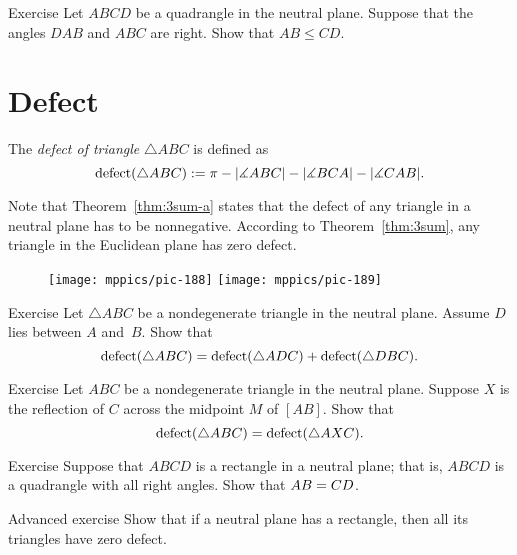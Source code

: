 \begin{thm}{Exercise}\label{ex:neutral-quadrangle}
Let $ABCD$ be a quadrangle in the neutral plane.
Suppose that the angles $DAB$ and $ABC$ are right.
Show that $AB\le CD$.
\end{thm}

\section*{Defect}

The \emph{defect of triangle} $\triangle ABC$ is defined as 
$$\mathop{\rm defect}\nolimits(\triangle ABC)
:= 
\pi-|\measuredangle ABC|-|\measuredangle BCA|-|\measuredangle CAB|.$$

Note that Theorem~\ref{thm:3sum-a} states that the defect of any triangle in a neutral plane has to be nonnegative.
According to Theorem~\ref{thm:3sum}, any triangle in
the Euclidean plane has zero defect.

{

\begin{wrapfigure}{o}{24mm}
\vskip-6mm
\centering
\texttt{[image: mppics/pic-188]}
\vskip4mm
\texttt{[image: mppics/pic-189]}
\end{wrapfigure}

\begin{thm}{Exercise}\label{ex:defect}
Let $\triangle ABC$ be a nondegenerate triangle in the neutral plane.
Assume $D$ lies between $A$ and~$B$.
Show that 
$$\mathop{\rm defect}\nolimits(\triangle ABC)=\mathop{\rm defect}\nolimits(\triangle ADC)+\mathop{\rm defect}\nolimits(\triangle DBC).$$

\end{thm}


\begin{thm}{Exercise}\label{ex:defect=} Let $ABC$ be a nondegenerate triangle in the neutral plane.
Suppose $X$ is the reflection of $C$ across the midpoint $M$ of $[AB]$.
Show that 
$$\mathop{\rm defect}\nolimits(\triangle ABC)=\mathop{\rm defect}\nolimits(\triangle AXC).$$
\end{thm}

}

\vskip-2mm

\begin{thm}{Exercise}\label{ex:neutral-rectangle}
Suppose that $ABCD$ is a rectangle in a neutral plane;
that is, $ABCD$ is a quadrangle with all right angles.
Show that $AB\z=CD$. 
\end{thm}

\begin{thm}{Advanced exercise}
Show that if a neutral plane has a rectangle, then all its triangles have zero defect.
\end{thm}


